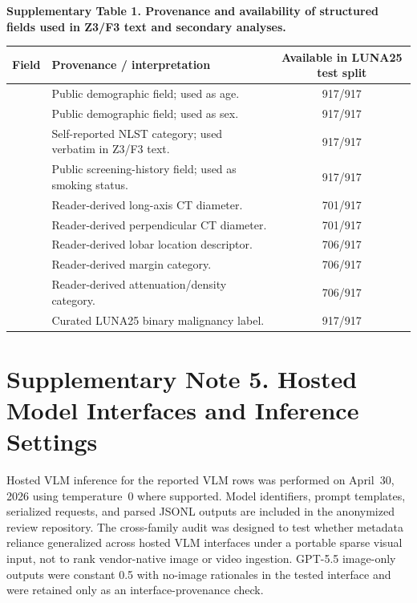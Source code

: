 \documentclass[11pt]{article}
\begin{document}
\begin{center}
\small
{}
\noindent\textbf{Supplementary Table 1. Provenance and availability of structured fields used in Z3/F3 text and secondary analyses.}\par\vspace{3pt}
\begin{tabularx}{\textwidth}{@{}lYc@{}}
\toprule
Field & Provenance / interpretation & Available in LUNA25 test split \\
\midrule
{} & Public demographic field; used as age. & 917/917 \\
 & Public demographic field; used as sex. & 917/917 \\
 & Self-reported NLST category; used verbatim in Z3/F3 text. & 917/917 \\
 & Public screening-history field; used as smoking status. & 917/917 \\
 & Reader-derived long-axis CT diameter. & 701/917 \\
 & Reader-derived perpendicular CT diameter. & 701/917 \\
 & Reader-derived lobar location descriptor. & 706/917 \\
 & Reader-derived margin category. & 706/917 \\
 & Reader-derived attenuation/density category. & 706/917 \\
 & Curated LUNA25 binary malignancy label. & 917/917 \\
\bottomrule
\end{tabularx}
\end{center}

\section*{Supplementary Note 5. Hosted Model Interfaces and Inference Settings}

Hosted VLM inference for the reported VLM rows was performed on April~30, 2026
using temperature~0 where supported. Model identifiers, prompt templates,
serialized requests, and parsed JSONL outputs are included in the anonymized
review repository. The cross-family audit was designed to test whether metadata
reliance generalized across hosted VLM interfaces under a portable sparse visual
input, not to rank vendor-native image or video ingestion. GPT-5.5 image-only
outputs were constant 0.5 with no-image rationales in the tested interface and
were retained only as an interface-provenance check.
\end{document}
